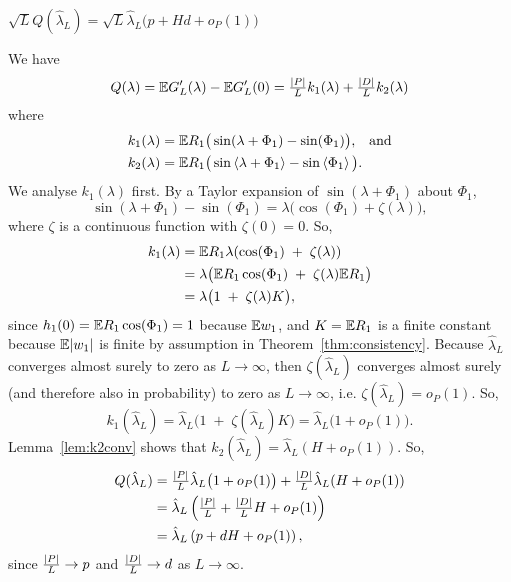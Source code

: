 \documentclass[journal]{IEEEtran}
\begin{document}
\begin{lemma}\label{lem:Qconv}
$\sqrt{L} Q(\hat{\lambda}_L) = \sqrt{L} \hat{\lambda}_L\big( p + Hd  + o_P(1) \big)$
\end{lemma}
\begin{IEEEproof}
We have
\[
Q(\lambda) = {\mathbb E} G_L^\prime(\lambda) - {\mathbb E} G_L^\prime(0) = \tfrac{{\left\vert P \right\vert}}{L} k_1(\lambda) + \tfrac{{\left\vert D \right\vert}}{L} k_2(\lambda)
\]
where
\begin{align}
k_1(\lambda) &= {\mathbb E} R_1\big( \sin(\lambda + \Phi_1) - \sin(\Phi_1) \big), \;\;\; \text{and} \nonumber\\
k_2(\lambda) &= {\mathbb E} R_1\big( \sin\left\langle \lambda + \Phi_1 \right\rangle - \sin\left\langle \Phi_1 \right\rangle \big). \label{eq:k2def}
\end{align}
We analyse $k_1(\lambda)$ first.  By a Taylor expansion of $\sin(\lambda + \Phi_1)$ about $\Phi_1$,
\[
\sin(\lambda + \Phi_1) - \sin(\Phi_1) = \lambda \big( \cos(\Phi_1) + \zeta(\lambda) \big),
\]
where $\zeta$ is a continuous function with $\zeta(0) = 0$.  So,
\begin{align*}
k_1(\lambda) &= {\mathbb E} R_1\lambda(\cos(\Phi_1) \; + \; \zeta(\lambda)) \\
&= \lambda \big( {\mathbb E} R_1\cos(\Phi_1) \; + \; \zeta(\lambda) {\mathbb E} R_1 \big) \\
&= \lambda \big( 1 \; + \; \zeta(\lambda) K \big),
\end{align*}
since $h_1(0) = {\mathbb E} R_1\cos(\Phi_1) = 1$ because ${\mathbb E} w_1$, and $K = {\mathbb E} R_1$ is a finite constant because ${\mathbb E}{\left\vert w_1 \right\vert}$ is finite by assumption in Theorem~\ref{thm:consistency}.  Because $\hat{\lambda}_L$ converges almost surely to zero as $L \rightarrow\infty$, then $\zeta(\hat{\lambda}_L)$ converges almost surely (and therefore also in probability) to zero as $L \rightarrow\infty$, i.e. $\zeta(\hat{\lambda}_L) = o_P(1)$.  So, 
\[
k_1(\hat{\lambda}_L) = \hat{\lambda}_L \big( 1 \; + \; \zeta(\hat{\lambda}_L) K \big) = \hat{\lambda}_L \big( 1  + o_P(1)\big).
\]
Lemma~\ref{lem:k2conv} shows that $k_2(\hat{\lambda}_L) = \hat{\lambda}_L ( H + o_P(1) )$.  So,
\begin{align*}
Q(\hat{\lambda}_L) &=  \tfrac{{\left\vert P \right\vert}}{L} \hat{\lambda}_L \big( 1  + o_P(1)\big)  + \tfrac{{\left\vert D \right\vert}}{L} \hat{\lambda}_L ( H + o_P(1) ) \\
&= \hat{\lambda}_L \left( \tfrac{{\left\vert P \right\vert}}{L}  + \tfrac{{\left\vert D \right\vert}}{L} H + o_P(1) \right) \\
&= \hat{\lambda}_L \left( p  + d H + o_P(1) \right),
\end{align*}
since $\frac{{\left\vert P \right\vert}}{L} \rightarrow p$ and $\frac{{\left\vert D \right\vert}}{L} \rightarrow d$ as $L \rightarrow \infty$.
\end{IEEEproof}
\end{document}
